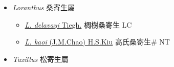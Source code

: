 
  \begin{itemize}
 \item[] \textit{Loranthus} 桑寄生屬
                    
  \begin{itemize}
        \item[] \href{http://www.theplantlist.org/tpl1.1/search?q=Loranthus+delavayi}{\textit{L. delavayi} Tiegh.}   椆樹桑寄生 LC
        \item[] \href{http://www.theplantlist.org/tpl1.1/search?q=Loranthus+kaoi}{\textit{L. kaoi} (J.M.Chao) H.S.Kiu}   高氏桑寄生\# NT
  \end{itemize}
 \item[] \textit{Taxillus} 松寄生屬
                    

\end{itemize}

